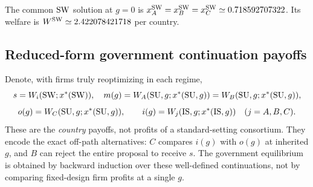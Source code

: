 The common $\mathrm{SW}$ solution at $g=0$ is
$x_A^{\mathrm{SW}}=x_B^{\mathrm{SW}}=x_C^{\mathrm{SW}}\simeq0.718592707322$.
Its welfare is $W^{\mathrm{SW}}\simeq2.422078421718$ per country.

\subsection{Reduced-form government continuation payoffs}

Denote, with firms truly reoptimizing in each regime,
\begin{equation}\label{eq:gov-payoffs}
 s=W_i(\mathrm{SW};x^*(\mathrm{SW})),\quad
 m(g)=W_A(\mathrm{SU},g;x^*(\mathrm{SU},g))
     =W_B(\mathrm{SU},g;x^*(\mathrm{SU},g)),
\end{equation}
\begin{equation}\label{eq:gov-payoffs2}
 o(g)=W_C(\mathrm{SU},g;x^*(\mathrm{SU},g)),\qquad
 i(g)=W_j(\mathrm{IS},g;x^*(\mathrm{IS},g))\quad (j=A,B,C).
\end{equation}
These are the \emph{country} payoffs, not profits of a standard-setting
consortium. They encode the exact off-path alternatives:
$C$ compares $i(g)$ with $o(g)$ at inherited $g$,
and $B$ can reject the entire proposal to receive $s$.
The government equilibrium is obtained by backward induction
over these well-defined continuations, not by comparing
fixed-design firm profits at a single $g$.
